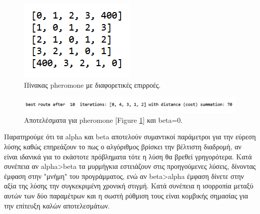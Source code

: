 \begin{figure}
    \centering
    \includegraphics[scale=1]{2947_thesis/pictures/pheromone.png} 
    \caption{Πίνακας pheromone με διαφορετικές επιρροές.}
    \label{15}
\end{figure}
\begin{figure}
    \centering
    \includegraphics[scale=0.55]{2947_thesis/pictures/ex3.png} 
    \caption{Αποτελέσματα για pheromone [Figure \ref{15}] και beta=0.}
    \label{16}
\end{figure}
Παρατηρούμε ότι τα alpha και beta αποτελούν συμαντικοί παράμετροι για την εύρεση λύσης καθώς επηρεάζουν το πως ο αλγόριθμος βρίσκει την βέλτιστη διαδρομή, αν είναι ιδανικά  για το εκάστοτε πρόβληματα τότε η λύση θα βρεθεί γρηγορότερα. Κατά συνέπεια αν alpha>beta τα μυρμήγκια εστειάζουν στις προηγούμενες λύσεις, δίνοντας έμφαση στην "μνήμη" του προγράμματος, ενώ αν beta>alpha έμφαση δίνετε στην αξία της λύσης την συγκεκριμένη χρονική στιγμή. Κατά συνέπεια η ισορροπία μεταξύ αυτών των δύο παραμέτρων και η σωστή ρύθμιση τους είναι κομβικής σημασίας για την επίτευξη καλών αποτελεσμάτων. 



